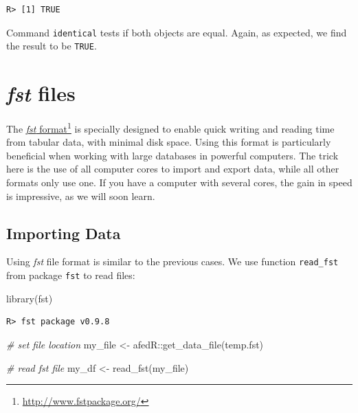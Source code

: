 \documentclass[
  12pt,
]{book}
\newenvironment{Shaded}{\begin{snugshade}}{\end{snugshade}}
\newcommand{\CommentTok}[1]{\textcolor[rgb]{0.37,0.37,0.37}{\textit{#1}}}
\newcommand{\FunctionTok}[1]{\textcolor[rgb]{0,0,0}{#1}}
\newcommand{\NormalTok}[1]{#1}
\newcommand{\OtherTok}[1]{\textcolor[rgb]{0.37,0.37,0.37}{#1}}
\newcommand{\SpecialCharTok}[1]{\textcolor[rgb]{0,0,0}{#1}}
\newcommand{\StringTok}[1]{\textcolor[rgb]{0.5,0.5,0.5}{#1}}
\begin{document}
\begin{verbatim}
R> [1] TRUE
\end{verbatim}

Command \texttt{identical} tests if both objects are equal. Again, as expected, we find the result to be \texttt{TRUE}.

\hypertarget{fst-files}{%
\section{\texorpdfstring{\emph{fst} files}{fst files}}\label{fst-files}}

The \href{http://www.fstpackage.org/}{\emph{fst} format}\footnote{\url{http://www.fstpackage.org/}} is specially designed to enable quick writing and reading time from tabular data, with minimal disk space. Using this format is particularly beneficial when working with large databases in powerful computers. The trick here is the use of all computer cores to import and export data, while all other formats only use one. If you have a computer with several cores, the gain in speed is impressive, as we will soon learn. 

\hypertarget{importing-data-3}{%
\subsection{Importing Data}\label{importing-data-3}}

Using \emph{fst} file format is similar to the previous cases. We use function \texttt{read\_fst} from package \texttt{fst} \citep{R-fst} to read files:

\begin{Shaded}
\begin{Highlighting}[]
\FunctionTok{library}\NormalTok{(fst)}
\end{Highlighting}
\end{Shaded}

\begin{verbatim}
R> fst package v0.9.8
\end{verbatim}

\begin{Shaded}
\begin{Highlighting}[]
\CommentTok{\# set file location}
\NormalTok{my\_file }\OtherTok{\textless{}{-}}\NormalTok{ afedR}\SpecialCharTok{::}\FunctionTok{get\_data\_file}\NormalTok{(}\StringTok{\textquotesingle{}temp.fst\textquotesingle{}}\NormalTok{)}

\CommentTok{\# read fst file}
\NormalTok{my\_df }\OtherTok{\textless{}{-}} \FunctionTok{read\_fst}\NormalTok{(my\_file)}
\end{Highlighting}
\end{Shaded}
\end{document}

